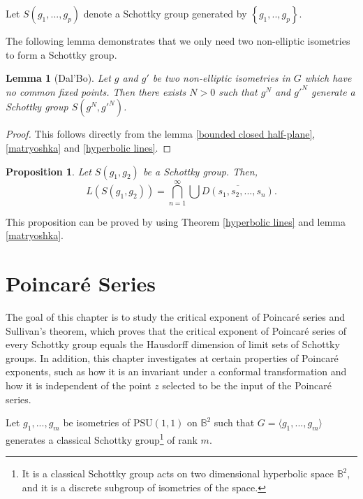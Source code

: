 \documentclass[12pt,oneside]{sfsuthesis}
\theoremstyle{plain} %
\newtheorem{lemma}[theorem]{Lemma}
\newtheorem{proposition}[theorem]{Proposition}
\theoremstyle{definition}  %
\theoremstyle{remark}  %
\theoremstyle{plain}
\begin{document}
{ 




Let $S(g_1,...,g_p)$ denote a Schottky group generated by $\left\lbrace g_1,..,g_p\right\rbrace$. 

The following lemma demonstrates that we only need two non-elliptic isometries to form a Schottky group.




\begin{lemma}[Dal'Bo]\label{schottky}
Let $g$ and $g'$ be two non-elliptic isometries in $G$ which have no common fixed points. Then there exists $N>0$ such that $g^{N}$ and $g'^{N}$ generate a Schottky group $S(g^{N},g'^{N})$.
\end{lemma}
\begin{proof}
This follows directly from the lemma \ref{bounded closed half-plane}, \ref{matryoshka} and \ref{hyperbolic lines}.
\end{proof}


\begin{proposition}
Let $S(g_1,g_2)$ be a Schottky group.
Then, $$L(S(g_1,g_2))=\bigcap_{n=1}^\infty \bigcup \overline{D(s_1,s_2,...,s_n)}.$$
\end{proposition}
This proposition can be proved by using Theorem \ref{hyperbolic lines} and lemma \ref{matryoshka}.


\chapter{Poincar\'{e} Series}\label{PoincareSeries}


The goal of this chapter is to study the critical exponent of Poincar\'{e} series and Sullivan's theorem, which proves that the critical exponent of Poincar\'{e} series of every Schottky group equals the Hausdorff dimension of limit sets of Schottky groups. In addition, this chapter investigates at certain properties of Poincar\'{e} exponents, such as how it is an invariant under a conformal transformation and how it is independent of the point $z$ selected to be the input of the Poincar\'{e} series.


Let $g_1,...,g_m$ be isometries of $\text{PSU}(1,1)$ on ${\mathbb B}^2$ such that $G = \langle g_1,...,g_m\rangle$ generates a classical Schottky group\footnote{It is a classical Schottky group acts on two dimensional hyperbolic space $\mathbb{B}^2$, and it is a discrete subgroup of isometries of the space.} of rank $m$. 

}
\end{document}
